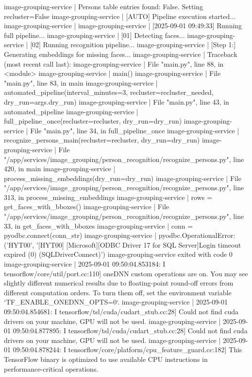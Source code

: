 image-grouping-service  | Persons table entries found: False. Setting recluster=False
image-grouping-service  | [AUTO] Pipeline execution started...
image-grouping-service  |
image-grouping-service  | [2025-09-01 09:49:33] Running full pipeline...
image-grouping-service  | [01] Detecting faces...
image-grouping-service  | [02] Running recognition pipeline...
image-grouping-service  | [Step 1:] Generating embeddings for missing faces...
image-grouping-service  | Traceback (most recent call last):
image-grouping-service  |   File "main.py", line 88, in <module>
image-grouping-service  |     main()
image-grouping-service  |   File "main.py", line 83, in main
image-grouping-service  |     automated_pipeline(interval_minutes=3, recluster=recluster_needed, dry_run=args.dry_run)
image-grouping-service  |   File "main.py", line 43, in automated_pipeline
image-grouping-service  |     full_pipeline_once(recluster=recluster, dry_run=dry_run)
image-grouping-service  |   File "main.py", line 34, in full_pipeline_once
image-grouping-service  |     recognize_persons_main(recluster=recluster, dry_run=dry_run)
image-grouping-service  |   File "/app/services/image_grouping/person_recognition/recognize_persons.py", line 420, in main
image-grouping-service  |     process_missing_embeddings(dry_run=dry_run)
image-grouping-service  |   File "/app/services/image_grouping/person_recognition/recognize_persons.py", line 313, in process_missing_embeddings
image-grouping-service  |     rows = get_faces_with_bboxes()
image-grouping-service  |   File "/app/services/image_grouping/person_recognition/recognize_persons.py", line 33, in get_faces_with_bboxes
image-grouping-service  |     conn = pyodbc.connect(conn_str)
image-grouping-service  | pyodbc.OperationalError: ('HYT00', '[HYT00] [Microsoft][ODBC Driver 17 for SQL Server]Login timeout expired (0) (SQLDriverConnect)')
image-grouping-service exited with code 0
image-grouping-service  | 2025-09-01 09:50:04.853184: I tensorflow/core/util/port.cc:110] oneDNN custom operations are on. You may see slightly different numerical results due to floating-point round-off errors from different computation orders. To turn them off, set the environment variable `TF_ENABLE_ONEDNN_OPTS=0`.
image-grouping-service  | 2025-09-01 09:50:04.854681: I tensorflow/tsl/cuda/cudart_stub.cc:28] Could not find cuda drivers on your machine, GPU will not be used.
image-grouping-service  | 2025-09-01 09:50:04.877895: I tensorflow/tsl/cuda/cudart_stub.cc:28] Could not find cuda drivers on your machine, GPU will not be used.
image-grouping-service  | 2025-09-01 09:50:04.878244: I tensorflow/core/platform/cpu_feature_guard.cc:182] This TensorFlow binary is optimized to use available CPU instructions in performance-critical operations.
